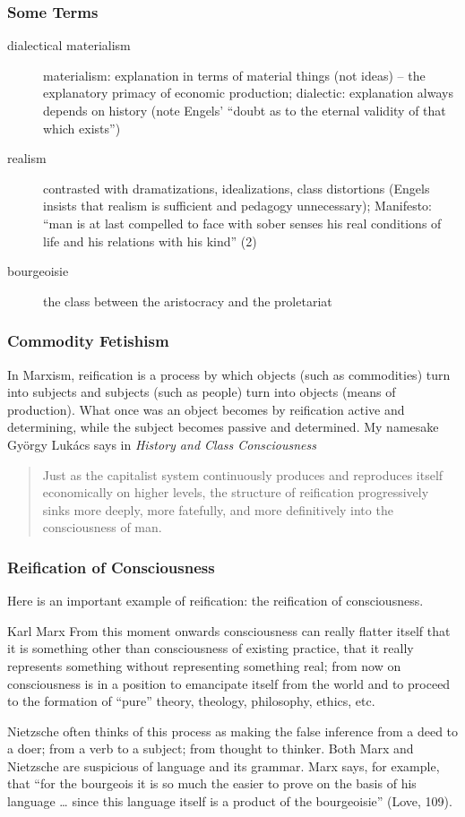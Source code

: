 \documentclass[xcolor=dvipsnames]{beamer}
\begin{document}
\begin{frame}
  \frametitle{Some Terms}
  \begin{description}
  \item[dialectical materialism] materialism: explanation in terms of
    material things (not ideas) -- the explanatory primacy of economic
    production; dialectic: explanation always depends on history (note
    Engels' ``doubt as to the eternal validity of that which exists'')
  \item[realism] contrasted with dramatizations, idealizations, class
    distortions (Engels insists that realism is sufficient and
    pedagogy unnecessary); Manifesto: ``man is at last compelled to
    face with sober senses his real conditions of life and his
    relations with his kind'' (2)
  \item[bourgeoisie] the class between the aristocracy and the
    proletariat
  \end{description}
\end{frame}

\begin{frame}
  \frametitle{Commodity Fetishism}
  In Marxism, \alert{reification} is a process by which objects (such
  as commodities) turn into subjects and subjects (such as people)
  turn into objects (means of production). What once was an object
  becomes by reification active and determining, while the subject
  becomes passive and determined. My namesake Gy{\"o}rgy Luk{\'a}cs
  says in \emph{History and Class Consciousness}
  \begin{quote}
    Just as the capitalist system continuously produces and reproduces
    itself economically on higher levels, the structure of reification
    progressively sinks more deeply, more fatefully, and more
    definitively into the consciousness of man.
  \end{quote}
\end{frame}

\begin{frame}
  \frametitle{Reification of Consciousness}
  Here is an important example of reification: the reification of
  consciousness.
  \begin{block}{Karl Marx}
    From this moment onwards consciousness can really flatter itself
    that it is something other than consciousness of existing
    practice, that it really represents something without representing
    something real; from now on consciousness is in a position to
    emancipate itself from the world and to proceed to the formation
    of ``pure'' theory, theology, philosophy, ethics, etc.
  \end{block}
  Nietzsche often thinks of this process as making the false inference
  from a deed to a doer; from a verb to a subject; from thought to
  thinker. Both Marx and Nietzsche are suspicious of language and its
  grammar. Marx says, for example, that ``for the bourgeois it is so
  much the easier to prove on the basis of his language {\ldots} since
  this language itself is a product of the bourgeoisie'' (Love, 109).
\end{frame}
\end{document}
